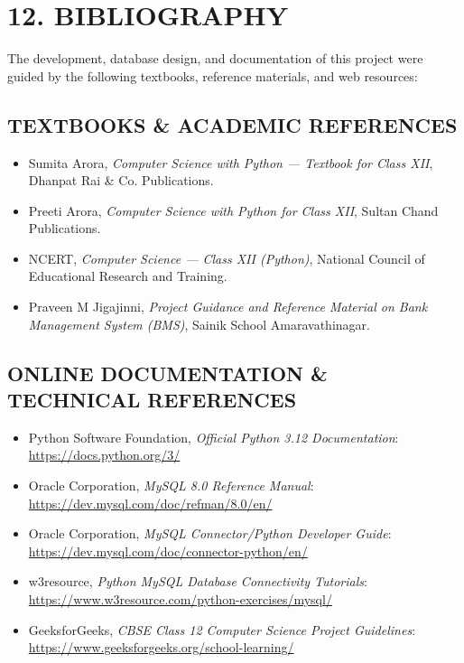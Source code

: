 \documentclass[12pt,a4paper]{article}
\begin{document}
\section*{12. BIBLIOGRAPHY}
\vspace{0.8em}

The development, database design, and documentation of this project were guided by the following textbooks, reference materials, and web resources:

\vspace{0.8em}
\subsection*{TEXTBOOKS \& ACADEMIC REFERENCES}
\begin{itemize}
    \item Sumita Arora, \textit{Computer Science with Python --- Textbook for Class XII}, Dhanpat Rai \& Co. Publications.
    \item Preeti Arora, \textit{Computer Science with Python for Class XII}, Sultan Chand Publications.
    \item NCERT, \textit{Computer Science --- Class XII (Python)}, National Council of Educational Research and Training.
    \item Praveen M Jigajinni, \textit{Project Guidance and Reference Material on Bank Management System (BMS)}, Sainik School Amaravathinagar.
\end{itemize}

\vspace{1.5em}
\subsection*{ONLINE DOCUMENTATION \& TECHNICAL REFERENCES}
\begin{itemize}
    \item Python Software Foundation, \textit{Official Python 3.12 Documentation}: \url{https://docs.python.org/3/}
    \item Oracle Corporation, \textit{MySQL 8.0 Reference Manual}: \url{https://dev.mysql.com/doc/refman/8.0/en/}
    \item Oracle Corporation, \textit{MySQL Connector/Python Developer Guide}: \url{https://dev.mysql.com/doc/connector-python/en/}
    \item w3resource, \textit{Python MySQL Database Connectivity Tutorials}: \url{https://www.w3resource.com/python-exercises/mysql/}
    \item GeeksforGeeks, \textit{CBSE Class 12 Computer Science Project Guidelines}: \url{https://www.geeksforgeeks.org/school-learning/}
\end{itemize}
\end{document}
